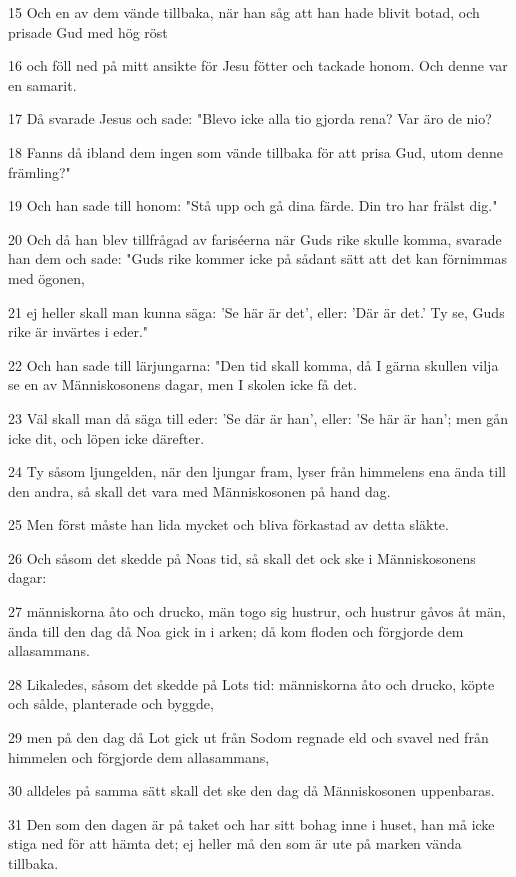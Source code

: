 \par 15 Och en av dem vände tillbaka, när han såg att han hade blivit botad, och prisade Gud med hög röst
\par 16 och föll ned på mitt ansikte för Jesu fötter och tackade honom. Och denne var en samarit.
\par 17 Då svarade Jesus och sade: "Blevo icke alla tio gjorda rena? Var äro de nio?
\par 18 Fanns då ibland dem ingen som vände tillbaka för att prisa Gud, utom denne främling?"
\par 19 Och han sade till honom: "Stå upp och gå dina färde. Din tro har frälst dig."
\par 20 Och då han blev tillfrågad av fariséerna när Guds rike skulle komma, svarade han dem och sade: "Guds rike kommer icke på sådant sätt att det kan förnimmas med ögonen,
\par 21 ej heller skall man kunna säga: 'Se här är det', eller: 'Där är det.' Ty se, Guds rike är invärtes i eder."
\par 22 Och han sade till lärjungarna: "Den tid skall komma, då I gärna skullen vilja se en av Människosonens dagar, men I skolen icke få det.
\par 23 Väl skall man då säga till eder: 'Se där är han', eller: 'Se här är han'; men gån icke dit, och löpen icke därefter.
\par 24 Ty såsom ljungelden, när den ljungar fram, lyser från himmelens ena ända till den andra, så skall det vara med Människosonen på hand dag.
\par 25 Men först måste han lida mycket och bliva förkastad av detta släkte.
\par 26 Och såsom det skedde på Noas tid, så skall det ock ske i Människosonens dagar:
\par 27 människorna åto och drucko, män togo sig hustrur, och hustrur gåvos åt män, ända till den dag då Noa gick in i arken; då kom floden och förgjorde dem allasammans.
\par 28 Likaledes, såsom det skedde på Lots tid: människorna åto och drucko, köpte och sålde, planterade och byggde,
\par 29 men på den dag då Lot gick ut från Sodom regnade eld och svavel ned från himmelen och förgjorde dem allasammans,
\par 30 alldeles på samma sätt skall det ske den dag då Människosonen uppenbaras.
\par 31 Den som den dagen är på taket och har sitt bohag inne i huset, han må icke stiga ned för att hämta det; ej heller må den som är ute på marken vända tillbaka.
